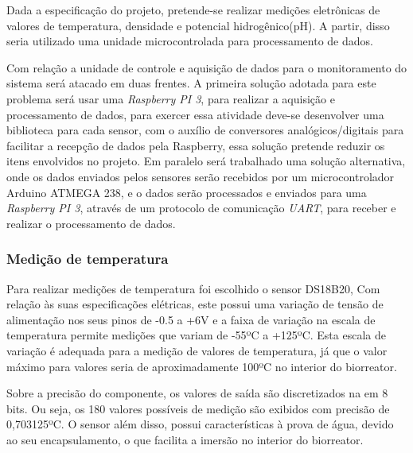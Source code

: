Dada a especificação do projeto, pretende-se realizar medições eletrônicas de valores de temperatura, densidade e potencial hidrogênico(pH). A partir, disso seria utilizado uma unidade microcontrolada para processamento de dados.

Com relação a unidade de controle e aquisição de dados para o monitoramento do sistema será atacado em duas frentes. A primeira solução adotada para este problema será usar uma \textit{Raspberry PI 3}, para realizar a aquisição e processamento de dados, para exercer essa atividade deve-se desenvolver uma biblioteca para cada sensor, com o auxílio de conversores analógicos/digitais para facilitar a recepção de dados pela Raspberry, essa solução pretende reduzir os itens envolvidos no projeto. Em paralelo será trabalhado uma solução alternativa, onde os dados enviados pelos sensores serão recebidos por um microcontrolador Arduino ATMEGA 238, e o dados serão processados e enviados para uma \textit{Raspberry PI 3}, através de um protocolo de comunicação \textit{UART}, para receber e realizar o processamento de dados.

\subsubsection{Medição de temperatura}

Para realizar medições de temperatura foi escolhido o sensor DS18B20, Com relação às suas especificações elétricas, este possui uma variação de tensão de alimentação nos seus pinos de -0.5 a +6V e a faixa de variação na escala de temperatura permite medições que variam de -55ºC a +125ºC. Esta escala de variação é adequada para a medição de valores de temperatura, já que o valor máximo para valores seria de aproximadamente 100ºC no interior do biorreator.

Sobre a precisão do componente, os valores de saída são discretizados na em 8 bits. Ou seja, os 180 valores possíveis de medição são exibidos com precisão de 0,703125ºC. O sensor além disso, possui características à prova de água, devido ao seu encapsulamento, o que facilita a imersão no interior do biorreator.

